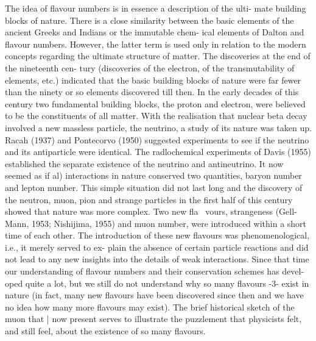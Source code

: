 \documentclass[twoside]{article}
\begin{document}
The idea of flavour numbers is in essence a description of the ulti-
mate building blocks of nature. There is a close similarity between the
basic elements of the ancient Greeks and Indians or the immutable chem-
ical elements of Dalton and flavour numbers. However, the latter term
is used only in relation to the modern concepts regarding the ultimate
structure of matter. The discoveries at the end of the nineteenth cen-
tury (discoveries of the electron, of the transmutability of elements,
etc.) indicated that the basic building blocks of nature were far fewer
than the ninety or so elements discovered till then. In the early decades
of this century two fundamental building blocks, the proton and electron,
were believed to be the constituents of all matter. With the realisation
that nuclear beta decay involved a new massless particle, the neutrino,
a study of its nature was taken up. Racah (1937) and Pontecorvo (1950)
suggested experiments to see if the neutrino and its antiparticle were
identical. The radlochemical experiments of Davis (1955) established the
separate existence of the neutrino and antineutrino. It now seemed as
if al) interactions in nature conserved two quantities, baryon number
and lepton number. This simple situation did not last long and the
discovery of the neutron, muon, pion and strange particles in the first
half of this century showed that nature was more complex. Two new fla~
vours, strangeness (Gell-Mann, 1953; Nishijima, 1955) and muon number,
were introduced within a short time of each other. The introduction of
these new flavours was phenomenological, i.e., it merely served to ex-
plain the absence of certain particle reactions and did not lead to any
new insights into the details of weak interactions. Since that time our
understanding of flavour numbers and their conservation schemes has devel-
oped quite a lot, but we still do not understand why so many flavours
-3-
exist in nature (in fact, many new flavours have been discovered since
then and we have no idea how many more flavours may exist). The brief
historical sketch of the muon that | now present serves to illustrate
the puzzlement that physicists felt, and still feel, about the existence
of so many flavours.
\end{document}
